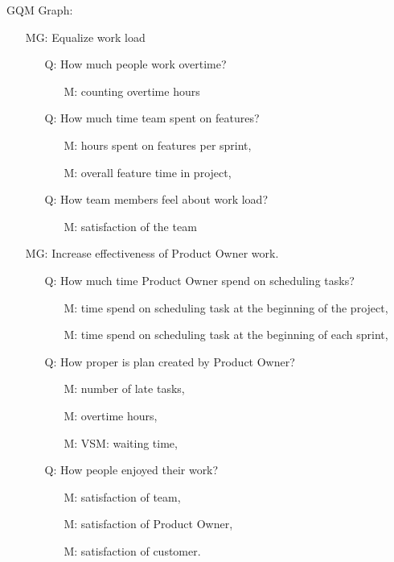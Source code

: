 GQM Graph:
\begin{itemize}
\item[MG:] Equalize work load
	\begin{itemize}
	\item[Q:] How much people work overtime?
    	\begin{itemize}
    	\item[M:] counting overtime hours
    	\end{itemize}
    \item[Q:] How much time team spent on features?
    	\begin{itemize}
    	\item[M:] hours spent on features per sprint,
        \item[M:] overall feature time in project,
    	\end{itemize}
    \item[Q:] How team members feel about work load?
    	\begin{itemize}
    	\item[M:] satisfaction of the team
    	\end{itemize}
	\end{itemize}
\item[MG:] Increase effectiveness of Product Owner work.
	\begin{itemize}
	\item[Q:] How much time Product Owner spend on scheduling tasks?
    	\begin{itemize}
    	\item[M:] time spend on scheduling task at the beginning of the project,
        \item[M:] time spend on scheduling task at the beginning of each sprint,
    	\end{itemize}
    \item[Q:] How proper is plan created by Product Owner?
    	\begin{itemize}
    	\item[M:] number of late tasks,
        \item[M:] overtime hours,
        \item[M:] VSM: waiting time,
    	\end{itemize}
    \item[Q:] How people enjoyed their work?
    	\begin{itemize}
    	\item[M:] satisfaction of team,
        \item[M:] satisfaction of Product Owner,
        \item[M:] satisfaction of customer.
    	\end{itemize}
	\end{itemize}
\end{itemize}